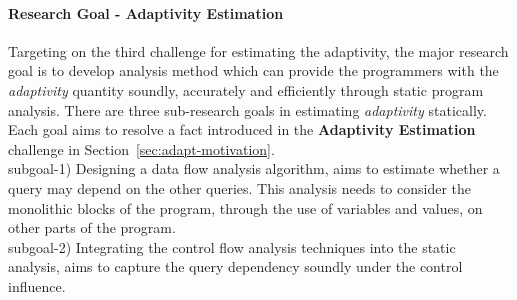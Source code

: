 \paragraph{Research Goal - Adaptivity Estimation}
Targeting on the third challenge
for estimating the adaptivity, 
the major research goal is to develop analysis method which can
provide the programmers with the \emph{adaptivity} quantity
soundly, accurately and
efficiently
through static program analysis.
There are three sub-research goals in estimating \emph{adaptivity} statically.
Each goal aims to resolve a fact introduced in the \textbf{Adaptivity Estimation} challenge in Section~\ref{sec:adapt-motivation}.
\\
subgoal-1) Designing a data flow analysis algorithm, aims to estimate whether a query may depend on the other queries. 
This analysis needs to consider the monolithic blocks of the program, through the use of variables and values, on other parts of the program.
\\
subgoal-2) Integrating the control flow analysis techniques into the static analysis,
 aims to 
capture the query dependency soundly
under the control influence.
